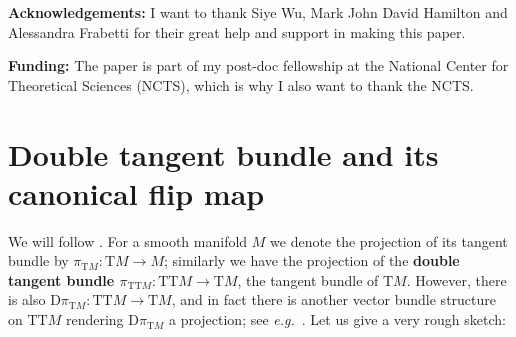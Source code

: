 \documentclass[a4paper,oneside,11pt,bibliography=totoc]{scrartcl}
\renewcommand{\theequation}{\arabic{equation}}
\renewcommand{\listoffigures}{\begingroup
\tocsection
\tocfile{\listfigurename}{lof}
\endgroup}
\renewcommand{\listoftables}{\begingroup
\tocsection
\tocfile{\listtablename}{lot}
\endgroup}
\theoremstyle{plain}
\theoremstyle{remark}
\theoremstyle{definition}
\begin{document}
\textbf{Acknowledgements:} I want to thank Siye Wu, Mark John David Hamilton and Alessandra Frabetti for their great help and support in making this paper.

\textbf{Funding:} The paper is part of my post-doc fellowship at the National Center for Theoretical Sciences (NCTS), which is why I also want to thank the NCTS.





\appendix
\setcounter{equation}{0}
\renewcommand{\theequation}{\Alph{section}.\arabic{equation}} %

\renewcommand\refname{List of References}






\section{Double tangent bundle and its canonical flip map}\label{DoubleTangentFlip}

We will follow \cite[\S 9.6, page 363]{mackenzieGeneralTheory}. For a smooth manifold $M$ we denote the projection of its tangent bundle by $\pi_{\mathrm{T}M}: \mathrm{T}M \to M$; similarly we have the projection of the \textbf{double tangent bundle $\pi_{\mathrm{TT}M}: \mathrm{TT}M \to \mathrm{T}M$}, the tangent bundle of $\mathrm{T}M$. However, there is also $\mathrm{D}\pi_{\mathrm{T}M}: \mathrm{TT}M \to \mathrm{T}M$, and in fact there is another vector bundle structure on $\mathrm{TT}M$ rendering $\mathrm{D}\pi_{\mathrm{T}M}$ a projection; see \textit{e.g.}\ \cite[\S 3.4 \textit{et seq.}; page 110ff.]{mackenzieGeneralTheory}. Let us give a very rough sketch:
\end{document}
